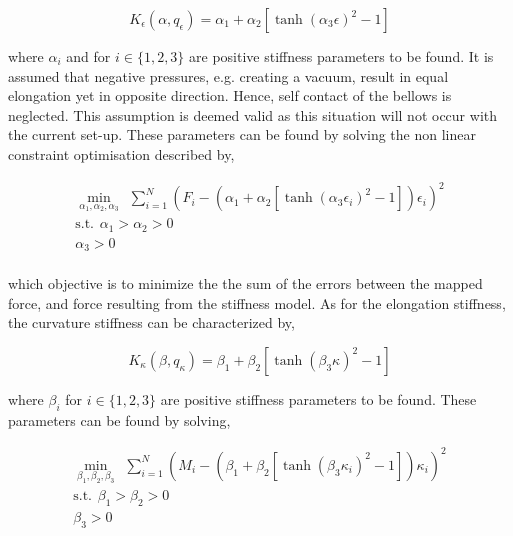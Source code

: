 \begin{equation}
    K_\epsilon(\alpha,q_\epsilon) =  \alpha_1 + \alpha_2 [\tanh({\alpha_3 \epsilon})^2 -1]
\end{equation}


where $\alpha_i$ and  for $i \in \{1,2,3\} $ are positive stiffness parameters to be found. It is assumed that negative pressures, e.g. creating a vacuum, result in equal elongation yet in opposite direction. Hence, self contact of the bellows is neglected. This assumption is deemed valid as this situation will not occur with the current set-up. These parameters can be found by solving the non linear constraint optimisation described by,


\begin{equation}
\begin{aligned}
\min_{\alpha_1,\alpha_2,\alpha_3} \hspace{5pt} \sum_{i=1}^{N}(F_i -  (\alpha_1 + \alpha_2 [\tanh({\alpha_3 \epsilon_i})^2 -1])\epsilon_i)^2    \\ 
\text{s.t.} \hspace{5pt} \alpha_1 > \alpha_2 > 0 \\
\alpha_3 > 0 \\ 
\label{eq3:Keopt}
\end{aligned}
\end{equation}

which objective is to minimize the the sum of the errors between the mapped force, and force resulting from the stiffness model. As for the elongation stiffness, the curvature stiffness can be characterized by,

\begin{equation}
    K_\kappa(\beta,q_\kappa) =  \beta_1 + \beta_2 [\tanh({\beta_3 \kappa})^2 -1]
\end{equation}


where $\beta_i$ for $i \in \{1,2,3\} $ are positive stiffness parameters to be found. These parameters can be found by solving,

\begin{equation}
\begin{aligned}
\min_{\beta_1,\beta_2,\beta_3} \hspace{5pt} \sum_{i=1}^{N}(M_i -  (\beta_1 + \beta_2 [\tanh({\beta_3 {\kappa_i}})^2 -1]){\kappa_i})^2    \\ 
\text{s.t.} \hspace{5pt} \beta_1 > \beta_2 > 0 \\
\beta_3 > 0 \\ 
\label{eq3:Kkopt}
\end{aligned}
\end{equation}



